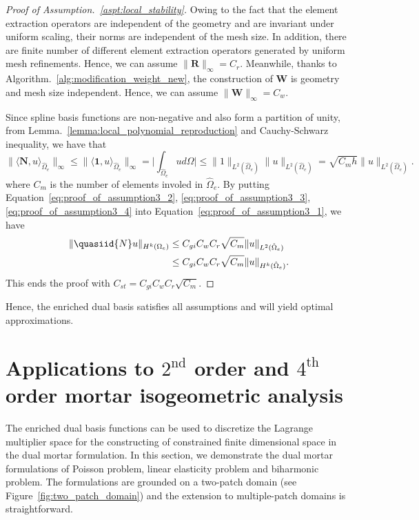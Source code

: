 \begin{proof}[Proof of Assumption.~\ref{aspt:local_stability}]
	Owing to the fact that the \Bezier element extraction operators are independent of the geometry and are invariant under uniform scaling, their norms are independent of the mesh size. In addition, there are finite number of different \Bezier element extraction operators generated by uniform mesh refinements. Hence, we can assume $\|\mathbf{R}\|_\infty=C_r$. Meanwhile, thanks to Algorithm.~\ref{alg:modification_weight_new}, the construction of $\mathbf{W}$ is geometry and mesh size independent. Hence, we can assume $\|\mathbf{W}\|_\infty=C_w$.\par

	Since spline basis functions are non-negative and also form a partition of unity, from Lemma.~\ref{lemma:local_polynomial_reproduction} and Cauchy-Schwarz inequality, we have that
	\begin{equation}
		\| \langle {\mathbf{N},u} \rangle_{\hat{\Omega}_e} \|_\infty \leq \| \langle {\mathbf{1},u} \rangle_{\hat{\Omega}_e} \|_\infty = \vert \int_{\hat{\Omega}_e} u d\Omega \vert \leq \|1\|_{L^2(\hat{\Omega}_e)} \|u\|_{L^2(\hat{\Omega}_e)}=\sqrt{C_m h} \|u\|_{L^2(\hat{\Omega}_e)}.\label{eq:proof_of_assumption3_4}
	\end{equation}
	where $C_m$ is the number of elements involed in $\hat{\Omega}_e$. By putting Equation~\eqref{eq:proof_of_assumption3_2}, \eqref{eq:proof_of_assumption3_3}, \eqref{eq:proof_of_assumption3_4} into Equation~\eqref{eq:proof_of_assumption3_1}, we have
	\begin{equation}
		\begin{split}
			\| \quasiid{N}u \|_{H^k(\Omega_e)} &\leq C_{gi}C_wC_r \sqrt{C_m} \|u\|_{L^2(\hat{\Omega}_e)} \\
			&\leq C_{gi}C_wC_r\sqrt{C_m}\|u\|_{H^k(\hat{\Omega}_e)}.
		\end{split}
	\end{equation}
	This ends the proof with $C_{st}=C_{gi}C_wC_r\sqrt{C_m}$.
\end{proof}
Hence, the enriched dual basis satisfies all assumptions and will yield optimal approximations.
\FloatBarrier

\section{Applications to $2^\text{nd}$ order and $4^\text{th}$ order mortar isogeometric analysis}\label{sec:dual_mortar}

The enriched dual basis functions can be used to discretize the Lagrange multiplier space for the constructing of constrained finite dimensional space in the dual mortar formulation. In this section, we demonstrate the dual mortar formulations of Poisson problem, linear elasticity problem and biharmonic problem. The formulations are grounded on a two-patch domain (see Figure~\ref{fig:two_patch_domain}) and the extension to multiple-patch domains is straightforward.

